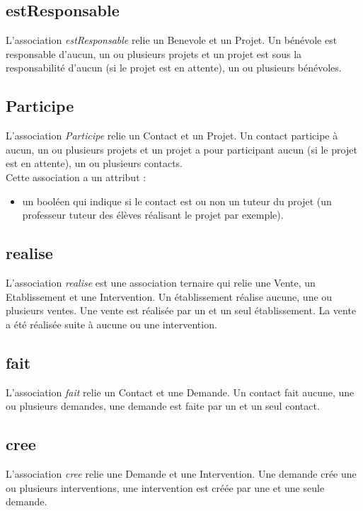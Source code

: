 \documentclass[asi, sansVersion]{picInsa}
\begin{document}
\subsection*{estResponsable}
L'association \textit{estResponsable} relie un Benevole et un Projet. Un bénévole est responsable d'aucun, un ou plusieurs projets et un projet est sous la responsabilité d'aucun (si le projet est en attente), un ou plusieurs bénévoles.

\subsection*{Participe}
L'association \textit{Participe} relie un Contact et un Projet. Un contact participe à aucun, un ou plusieurs projets et un projet a pour participant aucun (si le projet est en attente), un ou plusieurs contacts.\\
Cette association a un attribut :
\begin{itemize}
\item un booléen qui indique si le contact est ou non un tuteur du projet (un professeur tuteur des élèves réalisant le projet par exemple). 
\end{itemize}

\subsection*{realise}

L'association \textit{realise} est une association ternaire qui relie une Vente, un Etablissement et une Intervention. Un établissement réalise aucune, une ou plusieurs ventes. Une vente est réalisée par un et un seul établissement. La vente a été réalisée suite à aucune ou une intervention.

\subsection*{fait}

L'association \textit{fait} relie un Contact et une Demande. Un contact fait aucune, une ou plusieurs demandes, une demande est faite par un et un seul contact.

\subsection*{cree}

L'association \textit{cree} relie une Demande et une Intervention. Une demande crée une ou plusieurs interventions, une intervention est créée par une et une seule demande.
\end{document}
